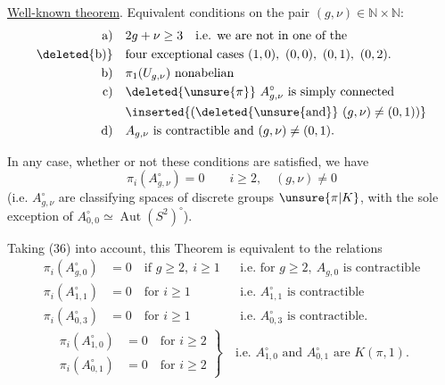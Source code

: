 
\uline{Well-known theorem}. Equivalent conditions on the pair $(g,\nu)\in\mathbb N\times\mathbb N$:
\[
\begin{aligned}
\text{a)}\quad &2g+\nu\geq3\quad\text{i.e. we are not in one of the}\\
\text{\deleted{b)}}\quad &\text{four exceptional cases }(1,0),\ (0,0),\ (0,1),\ (0,2).\\
\text{b)}\quad &\pi_1(U_{g,\nu})\text{ nonabelian}\\
\text{c)}\quad &\deleted{\unsure{\pi}}\ A_{g,\nu}^{\circ}\text{ is simply connected}\\
&\inserted{\text{(}\deleted{\unsure{\text{and}}}\ (g,\nu)\ne(0,1)\text{)}}\\
\text{d)}\quad &A_{g,\nu}\text{ is contractible and }(g,\nu)\ne(0,1).
\end{aligned}
\]

In any case, whether or not these conditions are satisfied, we have 
\[
\pi_i(A_{g,\nu}^{\circ})=0\qquad i\geq2,\quad(g,\nu)\ne0
\]
(i.e.  $A_{g,\nu}^{\circ}$ are classifying spaces of discrete groups $\unsure{\pi|K}$, with the sole exception of $A_{0,0}^{\circ}\simeq\operatorname{Aut}(S^2)^{\circ}$).

Taking (36) into account, this Theorem is equivalent to the relations
\[
\tag{37}
\begin{aligned}
\pi_i(A_{g,0}^{\circ})&=0\quad\text{if }g\geq2,\ i\geq1
&&\text{i.e. for }g\geq2,\ A_{g,0}\text{ is contractible}\\
\pi_i(A_{1,1}^{\circ})&=0\quad\text{for }i\geq1
&&\text{i.e. }A_{1,1}^{\circ}\text{ is contractible}\\
\pi_i(A_{0,3}^{\circ})&=0\quad\text{for }i\geq1
&&\text{i.e. }A_{0,3}^{\circ}\text{ is contractible}.
\end{aligned}
\]
\[
\tag{38}
\left.\begin{aligned}
\pi_i(A_{1,0}^{\circ})&=0\quad\text{for }i\geq2\\
\pi_i(A_{0,1}^{\circ})&=0\quad\text{for }i\geq2
\end{aligned}\right\}
\quad\text{i.e. }A_{1,0}^{\circ}\text{ and }A_{0,1}^{\circ}\text{ are }K(\pi,1).
\]

